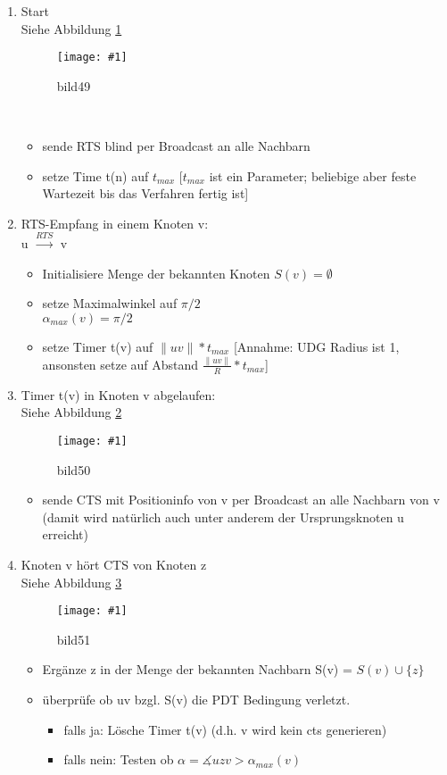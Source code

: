 \documentclass{article}
\newcommand{\bild}[4]{ %
	\begin{figure}[h!]
		\centering
		\texttt{[image: \#1]}
		\caption{#3}
		\label{#4}
	\end{figure}	
}
\newcommand{\sieheBild}[4]{
	Siehe Abbildung \ref{#4}
	\bild{#1}{#2}{#3}{#4}
}
\newcommand{\doubleAbs}[1]{
	\|#1\|
}
\begin{document}
\begin{enumerate}
	\item Start\\
	\sieheBild{Bilder/49.png}{0.4}{bild49}{Bild 49}
	\\
	\begin{itemize}
		\item sende RTS blind per Broadcast an alle Nachbarn
		\item setze Time t(n) auf $t_{max}$ [$t_{max}$ ist ein Parameter; beliebige aber feste Wartezeit bis das Verfahren fertig ist]
	\end{itemize}
	\item RTS-Empfang in einem Knoten v:\\
	u $\overset{RTS}{\rightarrow}$ v
	\\
	\begin{itemize}
		\item Initialisiere Menge der bekannten Knoten $S(v) = \emptyset$
		\item setze Maximalwinkel auf $\pi / 2$\\
		$\alpha_{max} (v) = \pi/ 2$
		\item setze Timer t(v) auf $\doubleAbs{uv} * t_{max}$ [Annahme: UDG Radius ist 1, ansonsten setze auf Abstand $\frac{\doubleAbs{uv}}{R} * t_{max}$]
	\end{itemize}
	\item Timer t(v) in Knoten v abgelaufen:\\
	\sieheBild{Bilder/50.png}{0.4}{bild50}{Bild 50}
	\begin{itemize}
		\item sende CTS mit Positioninfo von v per Broadcast an alle Nachbarn von v (damit wird natürlich auch unter anderem der Ursprungsknoten u erreicht)
	\end{itemize}
	\item Knoten v hört CTS von Knoten z\\
	\sieheBild{Bilder/51.png}{0.4}{bild51}{Bild 51}
	\begin{itemize}
		\item Ergänze z in der Menge der bekannten Nachbarn S(v) = $S(v) \cup \{z\}$
		\item überprüfe ob uv bzgl. S(v) die PDT Bedingung verletzt. \begin{itemize}
			\item falls ja: Lösche Timer t(v) (d.h. v wird kein cts generieren)
			\item falls nein: Testen ob $\alpha = \measuredangle uzv > \alpha_{max}(v)$
			\begin{itemize}

\end{itemize}
\end{itemize}
\end{itemize}
\end{enumerate}
\end{document}

